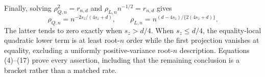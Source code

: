 Finally, solving \(\rho_{Q,n}^2=r_{n,d}\) and \(\rho_{L,n}n^{-1/2}=r_{n,d}\) gives
\[
\rho_{Q,n}=n^{-2s_z/(4s_z+d)},
\qquad
\rho_{L,n}=n^{(d-4s_z)/\{2(4s_z+d)\}}.                          \tag{17}
\]
The latter tends to zero exactly when \(s_z>d/4\). When \(s_z\le d/4\), the equality-local quadratic lower term is at least root-\(n\) order while the first projection vanishes at equality, excluding a uniformly positive-variance root-\(n\) description. Equations (4)--(17) prove every assertion, including that the remaining conclusion is a bracket rather than a matched rate.